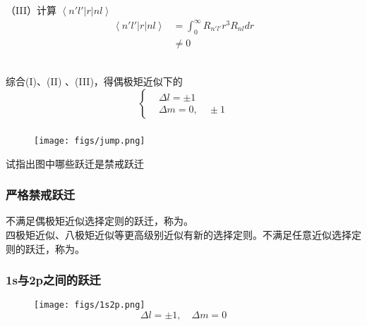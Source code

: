 \begin{frame} 
  \frametitle{}
  （III）计算 $\left\langle  n'l' \right\vert r \left\vert nl \right\rangle$ \\
  \[ \begin{aligned} \left\langle  n'l' \right\vert r \left\vert nl \right\rangle 
    &=  \int_0^{\infty} R_{n'l'} r^3 R_{nl} dr  \\
    &\ne 0 
    \end{aligned}
    \]

  ~~\\
  综合(I)、(II) 、(III)，得偶极矩近似下的\emf[选择定则] 
  \[
  \left\{ \begin{aligned}
     & \Delta l = \pm 1\\
     &  \Delta m = 0,\quad \pm 1
  \end{aligned}\right. 
  \]
\end{frame} 

\begin{frame} 
  \frametitle{}
\begin{figure}[htbp]
  \centering
  \texttt{[image: figs/jump.png]}
\end{figure}
试指出图中哪些跃迁是禁戒跃迁
\end{frame} 

\begin{frame} 
  \frametitle{严格禁戒跃迁}
\begin{itemize}
  \Item 不满足偶极矩近似选择定则的跃迁，称为\emf[禁戒跃迁]。
  ~~\\  
  \Item 四极矩近似、八极矩近似等更高级别近似有新的选择定则。不满足任意近似选择定则的跃迁，称为\emf[严格禁戒跃迁]。
\end{itemize}
\end{frame} 

\begin{frame} 
  \frametitle{1s与2p之间的跃迁}
  
  \begin{figure}[htbp]
    \centering
    \texttt{[image: figs/1s2p.png]}
  \[\Delta l = \pm 1, \quad \Delta m = 0 \]
  \end{figure}
  \begin{center}
  \end{center} 
\end{frame} 


